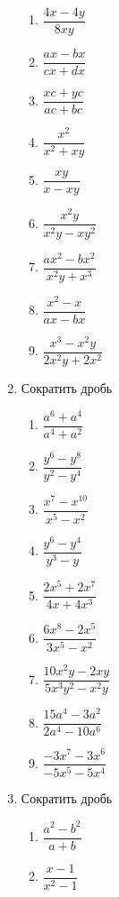 \documentclass[10pt, a4paper]{article}
\begin{document}
\begin{enumerate}
\begin{multicols}{4}
\begin{enumerate}
			\item $\dfrac{4x-4y}{8xy}$ 
			\item $\dfrac{ax-bx}{cx+dx}$ 
			\item $\dfrac{xc+yc}{ac+bc}$ 
			\item $\dfrac{x^2}{x^2+xy}$ 
			\item $\dfrac{xy}{x-xy}$ 
			\item $\dfrac{x^2y}{x^2y-xy^2}$ 
			\item $\dfrac{ax^2-bx^2}{x^2y+x^3}$ 
			\item $\dfrac{x^2-x}{ax-bx}$ 
			\item $\dfrac{x^3-x^2y}{2x^2y+2x^2}$ 
		\end{enumerate}	
	\end{multicols}
	\item Сократить дробь
	\begin{multicols}{3}
		\begin{enumerate}
			\item $\dfrac{a^6+a^4}{a^4+a^2}$ 
			\item $\dfrac{y^6-y^8}{y^2-y^4}$ 
			\item $\dfrac{x^7-x^{10}}{x^5-x^2}$ 
			\item $\dfrac{y^6-y^4}{y^3-y}$ 
			\item $\dfrac{2x^5+2x^7}{4x+4x^3}$ 
			\item $\dfrac{6x^8-2x^5}{3x^5-x^2}$ 
			\item $\dfrac{10x^2y-2xy}{5x^3y^2-x^2y}$ 
			\item $\dfrac{15a^4-3a^2}{2a^4-10a^6}$ 
			\item $\dfrac{-3x^7-3x^6}{-5x^5-5x^4}$ 
		\end{enumerate}	
	\end{multicols}
	\newpage
	\item Сократить дробь
	\begin{multicols}{3}
		\begin{enumerate}
			\item $\dfrac{a^2-b^2}{a+b}$ 
			\item $\dfrac{x-1}{x^2-1}$ 

\end{enumerate}
\end{multicols}
\end{enumerate}
\end{document}
